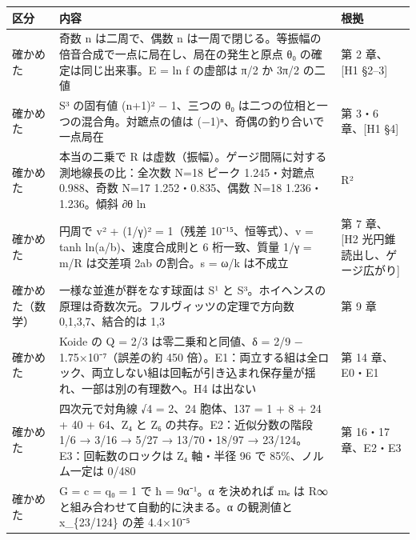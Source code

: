 \documentclass[
  a4paper,
]{ltjsarticle}
\newcounter{none} %
\begin{document}
{\def\LTcaptype{none} %
\begin{longtable}[]{@{}
  >{\raggedright\arraybackslash}p{}
  >{\raggedright\arraybackslash}p{}
  >{\raggedright\arraybackslash}p{}@{}}
\toprule\noalign{}
\begin{minipage}[b]{\linewidth}\raggedright
区分
\end{minipage} & \begin{minipage}[b]{\linewidth}\raggedright
内容
\end{minipage} & \begin{minipage}[b]{\linewidth}\raggedright
根拠
\end{minipage} \\
\midrule\noalign{}
\endhead
\bottomrule\noalign{}
\endlastfoot
確かめた & 奇数 n は二周で、偶数 n
は一周で閉じる。等振幅の倍音合成で一点に局在し、局在の発生と原点 θ₀
の確定は同じ出来事。E = ln f の虚部は π/2 か 3π/2 の二値 & 第 2
章、{[}H1 §2--3{]} \\
確かめた & S³ の固有値 (n+1)² − 1、三つの θ₀
は二つの位相と一つの混合角。対蹠点の値は (−1)ⁿ、奇偶の釣り合いで一点局在
& 第 3・6 章、{[}H1 §4{]} \\
確かめた & 本当の二乗で R
は虚数（振幅）。ゲージ間隔に対する測地線長の比：全次数 N=18 ピーク
1.245・対蹠点 0.988、奇数 N=17 1.252・0.835、偶数 N=18
1.236・1.236。傾斜 ∂θ ln & R² \\
確かめた & 円周で v² + (1/γ)² = 1（残差 10⁻¹⁵、恒等式）、v = tanh
ln(a/b)、速度合成則と 6 桁一致、質量 1/γ = m/R は交差項 2ab の割合。s =
ω/k は不成立 & 第 7 章、{[}H2 光円錐読出し、ゲージ広がり{]} \\
確かめた（数学） & 一様な並進が群をなす球面は S¹ と
S³。ホイヘンスの原理は奇数次元。フルヴィッツの定理で方向数
0,1,3,7、結合的は 1,3 & 第 9 章 \\
確かめた & Koide の Q = 2/3 は零二乗和と同値、δ = 2/9 −
1.75×10⁻⁷（誤差の約 450
倍）。E1：両立する組は全ロック、両立しない組は回転が引き込まれ保存量が揺れ、一部は別の有理数へ。H4
は出ない & 第 14 章、E0・E1 \\
確かめた & 四次元で対角線 √4 = 2、24 胞体、137 = 1 + 8 + 24 + 40 +
64、Z₄ と Z₆ の共存。E2：近似分数の階段 1/6 → 3/16 → 5/27 → 13/70・18/97
→ 23/124。E3：回転数のロックは Z₄ 軸・半径 96 で 85\%、ノルム一定は
0/480 & 第 16・17 章、E2・E3 \\
確かめた & G = c = q₀ = 1 で ħ = 9α⁻¹。α を決めれば mₑ は R∞
と組み合わせて自動的に決まる。α の観測値と x\_\{23/124\} の差 4.4×10⁻⁵ &

\end{longtable}}
\end{document}
